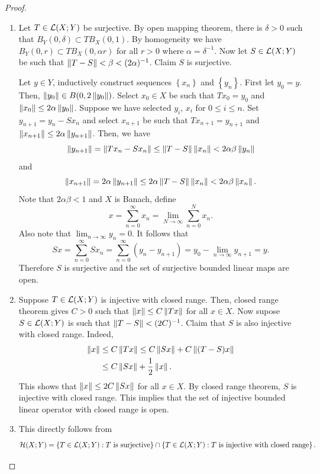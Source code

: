 \documentclass[a4paper]{article}
\begin{document}
\begin{proof}
\begin{enumerate}
\item Let $T \in \mathcal{L}(X; Y)$ be surjective. By open mapping 
theorem, there is $\delta > 0$ such that $B_Y(0, \delta) 
\subset TB_X(0, 1)$. By homogeneity we have 
$B_Y(0, r) \subset TB_X(0, \alpha r)$ for all $r > 0$ where 
$\alpha = \delta^{-1}$. Now let $S \in \mathcal{L}(X; Y)$ be such that 
$\left\lVert T - S\right\rVert < \beta < (2\alpha)^{-1}$. Claim $S$ is surjective.

Let $y \in Y$, inductively construct sequences $\left\{ x_n \right\}$
and $\left\{ y_n \right\}$. First let $y_0 = y$. Then,
$\left\lVert y_0\right\rVert \in B(0, 2\left\lVert y_0\right\rVert)$. Select 
$x_0 \in X$ be such that $T x_0 = y_0$ and $\left\lVert x_0\right\rVert 
\leq 2 \alpha \left\lVert y_0\right\rVert$. Suppose we have selected $y_i$,
$x_i$ for $0 \leq i \leq n$. Set $y_{n+1} = y_n - S x_n$
and select $x_{n+1}$ be such that $T x_{n+1} = y_{n+1}$
and $\left\lVert x_{n+1}\right\rVert \leq 2\alpha \left\lVert y_{n+1}\right\rVert$.
Then, we have 
\[
\left\lVert y_{n+1}\right\rVert = \left\lVert T x_n - S x_n\right\rVert \leq
\left\lVert T - S\right\rVert \left\lVert x_n\right\rVert < 2 \alpha\beta \left\lVert y_n\right\rVert
\]
and 
\[
\left\lVert x_{n+1}\right\rVert = 2 \alpha \left\lVert y_{n+1}\right\rVert \leq
2 \alpha \left\lVert T - S\right\rVert \left\lVert x_n\right\rVert < 2 \alpha \beta \left\lVert x_n\right\rVert.
\]
Note that $2 \alpha\beta < 1$ and $X$ is Banach, define 
\[
x = \sum_{n=0}^\infty x_n = \lim_{N \to \infty} 
\sum_{n = 0}^N x_n.
\]
Also note that $\lim_{n \to \infty} y_n = 0$. It follows 
that 
\[
S x = \sum_{n=0}^\infty S x_n 
= \sum_{n=0}^\infty (y_n - y_{n+1})
= y_0 - \lim_{n \to \infty} y_{n+1} = y.
\]
Therefore $S$ is surjective and the set of surjective 
bounded linear maps are open.

\item Suppose $T \in \mathcal{L}(X; Y)$ is injective with closed range.
Then, closed range theorem gives $C > 0$ such that 
$\left\lVert x\right\rVert \leq C \left\lVert T x\right\rVert$ for all $x \in X$. Now supose 
$S \in \mathcal{L}(X; Y)$ is such that $\left\lVert T - S\right\rVert < (2C)^{-1}$.
Claim that $S$ is also injective with closed range. Indeed,
\[
\begin{aligned}
  \left\lVert x\right\rVert &\leq C\left\lVert T x\right\rVert \leq C \left\lVert Sx\right\rVert + C \left\lVert (T-S)x\right\rVert \\
  & \leq C \left\lVert Sx\right\rVert + \frac{1}{2}\left\lVert x\right\rVert.
\end{aligned}
\]
This shows that $\left\lVert x\right\rVert \leq 2C \left\lVert Sx\right\rVert$ for all $x \in X$.
By closed range theorem, $S$ is injective with closed range.
This implies that the set of injective bounded linear operator
with closed range is open.

\item This directly follows from 
\[
\mathcal{H}(X; Y) = \left\{ T \in \mathcal{L}(X; Y) : \text{$T$ is surjective} \right\} 
\cap \left\{ T \in \mathcal{L}(X; Y) : \text{$T$ is injective with closed range} \right\}.
\]
\end{enumerate}

\end{proof}
\end{document}
